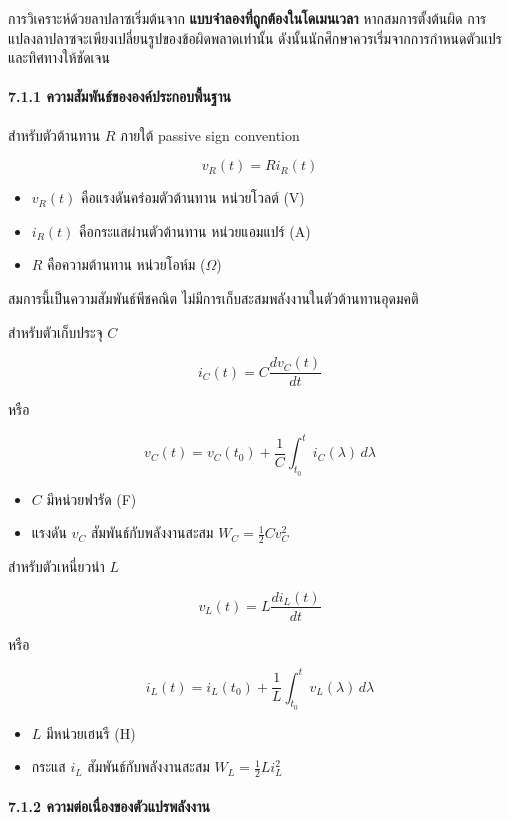 การวิเคราะห์ด้วยลาปลาซเริ่มต้นจาก \textbf{แบบจำลองที่ถูกต้องในโดเมนเวลา} หากสมการตั้งต้นผิด การแปลงลาปลาซจะเพียงเปลี่ยนรูปของข้อผิดพลาดเท่านั้น ดังนั้นนักศึกษาควรเริ่มจากการกำหนดตัวแปรและทิศทางให้ชัดเจน

\paragraph{7.1.1 ความสัมพันธ์ขององค์ประกอบพื้นฐาน}

สำหรับตัวต้านทาน $R$ ภายใต้ passive sign convention

\[
v_R(t)=R i_R(t)
\]

\begin{itemize}
    \item $v_R(t)$ คือแรงดันคร่อมตัวต้านทาน หน่วยโวลต์ (V)
    \item $i_R(t)$ คือกระแสผ่านตัวต้านทาน หน่วยแอมแปร์ (A)
    \item $R$ คือความต้านทาน หน่วยโอห์ม ($\Omega$)
\end{itemize}

สมการนี้เป็นความสัมพันธ์พีชคณิต ไม่มีการเก็บสะสมพลังงานในตัวต้านทานอุดมคติ

สำหรับตัวเก็บประจุ $C$

\[
i_C(t)=C\frac{dv_C(t)}{dt}
\]

หรือ

\[
v_C(t)=v_C(t_0)+\frac{1}{C}\int_{t_0}^{t}i_C(\lambda)\,d\lambda
\]

\begin{itemize}
    \item $C$ มีหน่วยฟารัด (F)
    \item แรงดัน $v_C$ สัมพันธ์กับพลังงานสะสม $W_C=\tfrac{1}{2}Cv_C^2$
\end{itemize}

สำหรับตัวเหนี่ยวนำ $L$

\[
v_L(t)=L\frac{di_L(t)}{dt}
\]

หรือ

\[
i_L(t)=i_L(t_0)+\frac{1}{L}\int_{t_0}^{t}v_L(\lambda)\,d\lambda
\]

\begin{itemize}
    \item $L$ มีหน่วยเฮนรี (H)
    \item กระแส $i_L$ สัมพันธ์กับพลังงานสะสม $W_L=\tfrac{1}{2}Li_L^2$
\end{itemize}

\paragraph{7.1.2 ความต่อเนื่องของตัวแปรพลังงาน}

